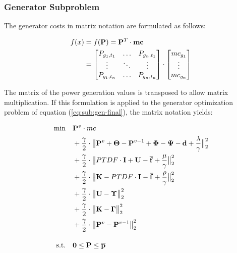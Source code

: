 \subsubsection*{Generator Subproblem}

The generator costs in matrix notation are formulated as follows:

\begin{subequations}
	\begin{align}
		f(x) &= f(\vb{P}) = \vb{P}^T \cdot \vb{mc}\\
		& = \begin{bmatrix}
			P_{g_1,t_1} & \dots & P_{g_n,t_1} \\
			\vdots & \ddots & \vdots \\
			P_{g_1,t_n} & \dots & P_{g_n,t_n}
		\end{bmatrix} \cdot \begin{bmatrix}
			mc_{g_1} \\
			\vdots \\
			mc_{g_n}
		\end{bmatrix}
	\end{align}
\end{subequations}

The matrix of the power generation values is transposed to allow matrix multiplication. If this formulation is applied to the generator optimization problem of equation (\ref{eq:sub:gen-final}), the matrix notation yields:

 \begin{subequations}
	\begin{align}
		 \min \quad & \vb{P}^v \cdot mc \\
		 & + \frac{\gamma}{2} \cdot \big\| \vb{P}^v + \vb{\Theta} - \vb{P}^{v-1} + \vb{\Phi} - \vb{\Psi} - \vb{d} + \frac{\vb{\lambda}}{\gamma} \big\|^2_2 \\
		 & + \frac{\gamma}{2} \cdot \big\| PTDF \cdot \vb{I} + \vb{U} - \vb{\overline{f}} + \frac{\vb{\mu}}{\gamma}\big\|^2_2 \nonumber \\
		 & + \frac{\gamma}{2} \cdot \big\| \vb{K} - PTDF \cdot \vb{I} - \vb{\overline{f}} + \frac{\vb{\rho}}{\gamma}\big\|^2_2 \nonumber \\
		 & + \frac{\gamma}{2} \cdot \big\| \vb{U} - \vb{\Upsilon}  \big\|^2_2 \nonumber\\
		 & + \frac{\gamma}{2} \cdot \big\| \vb{K} - \vb{\Gamma} \big\|^2_2 \nonumber \\
		 & + \frac{\gamma}{2} \cdot \big\| \vb{P}^v - \vb{P}^{v-1} \big\|^2_2 \nonumber \\[10pt]
		 \text{s.t.} \quad & \vb{0} \leq \vb{P} \leq \vb{\overline{p}}
	\end{align}
\end{subequations}

